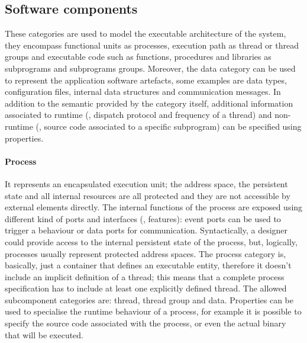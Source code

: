 \subsection{Software components}
These categories are used to model the executable architecture of the system, they encompass functional units as processes, execution path as thread or thread groups and executable code such as functions, procedures and libraries as subprograms and subprograms groups. Moreover, the data category can be used to represent the application software artefacts, some examples are data types, configuration files, internal data structures and communication messages. In addition to the semantic provided by the category itself, additional information associated to runtime (\eg, dispatch protocol and frequency of a thread) and non-runtime (\eg, source code associated to a specific subprogram) can be specified using properties.

\paragraph{Process} It represents an encapsulated execution unit; the address space, the persistent state and all internal resources are all protected and they are not accessible by external elements directly. The internal functions of the process are exposed using different kind of ports and interfaces (\ie, features): event ports can be used to trigger a behaviour or data ports for communication. Syntactically, a designer could provide access to the internal persistent state of the process, but, logically, processes usually represent protected address spaces. The process category is, basically, just a container that defines an executable entity, therefore it doesn't include an implicit definition of a thread; this means that a complete process specification has to include at least one explicitly defined thread. The allowed subcomponent categories are: thread, thread group and data. Properties can be used to specialise the runtime behaviour of a process, for example it is possible to specify the source code associated with the process, or even the actual binary that will be executed. 

